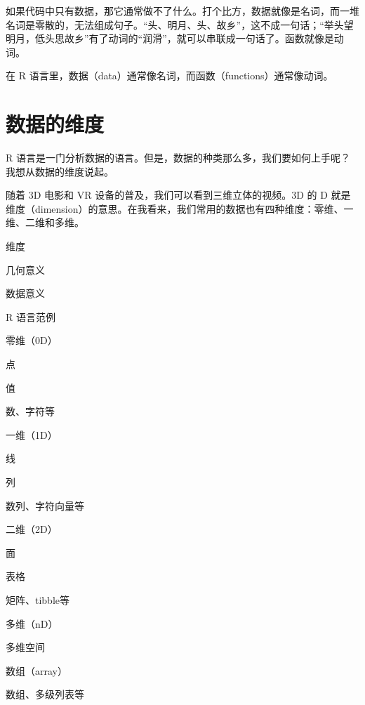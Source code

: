 \documentclass[
  letterpaper,
]{ctexbook}
\begin{document}
如果代码中只有数据，那它通常做不了什么。打个比方，数据就像是名词，而一堆名词是零散的，无法组成句子。``头、明月、头、故乡''，这不成一句话；``举头望明月，低头思故乡''有了动词的``润滑''，就可以串联成一句话了。函数就像是动词。

\begin{tcolorbox}[enhanced jigsaw, bottomtitle=1mm, bottomrule=.15mm, coltitle=black, title=\textcolor{quarto-callout-note-color}{\faInfo}\hspace{0.5em}{笔记}, toptitle=1mm, colframe=quarto-callout-note-color-frame, colbacktitle=quarto-callout-note-color!10!white, opacitybacktitle=0.6, arc=.35mm, opacityback=0, breakable, toprule=.15mm, left=2mm, titlerule=0mm, rightrule=.15mm, colback=white, leftrule=.75mm]

在 R 语言里，数据（data）通常像名词，而函数（functions）通常像动词。

\end{tcolorbox}

\hypertarget{ux6570ux636eux7684ux7ef4ux5ea6}{%
\section{数据的维度}\label{ux6570ux636eux7684ux7ef4ux5ea6}}

R
语言是一门分析数据的语言。但是，数据的种类那么多，我们要如何上手呢？我想从数据的维度说起。

随着 3D 电影和 VR 设备的普及，我们可以看到三维立体的视频。3D 的 D
就是维度（dimension）的意思。在我看来，我们常用的数据也有四种维度：零维、一维、二维和多维。

维度

几何意义

数据意义

R 语言范例

零维（0D）

点

值

数、字符等

一维（1D）

线

列

数列、字符向量等

二维（2D）

面

表格

矩阵、tibble等

多维（nD）

多维空间

数组（array）

数组、多级列表等
\end{document}
